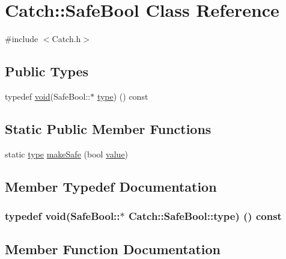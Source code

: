 \hypertarget{class_catch_1_1_safe_bool}{}\section{Catch\+:\+:Safe\+Bool Class Reference}
\label{class_catch_1_1_safe_bool}


{\ttfamily \#include $<$Catch.\+h$>$}

\subsection*{Public Types}
\begin{DoxyCompactItemize}
\item 
typedef \hyperlink{_s_d_l__opengles2__gl2ext_8h_ae5d8fa23ad07c48bb609509eae494c95}{void}(Safe\+Bool\+::$\ast$ \hyperlink{class_catch_1_1_safe_bool_a852cdacb020a98edeee0f4da4cf790d5}{type}) () const 
\end{DoxyCompactItemize}
\subsection*{Static Public Member Functions}
\begin{DoxyCompactItemize}
\item 
static \hyperlink{_s_d_l__opengl_8h_ad5ddf6fca7b585646515660e810e0188}{type} \hyperlink{class_catch_1_1_safe_bool_af0ea63d9820f8bf7a8b76377913c4e77}{make\+Safe} (bool \hyperlink{_s_d_l__opengl__glext_8h_a8ad81492d410ff2ac11f754f4042150f}{value})
\end{DoxyCompactItemize}


\subsection{Member Typedef Documentation}
\subsubsection[{\texorpdfstring{type}{type}}]{\setlength{\rightskip}{0pt plus 5cm}typedef {\bf void}(Safe\+Bool\+::$\ast$ Catch\+::\+Safe\+Bool\+::type) () const }\hypertarget{class_catch_1_1_safe_bool_a852cdacb020a98edeee0f4da4cf790d5}{}\label{class_catch_1_1_safe_bool_a852cdacb020a98edeee0f4da4cf790d5}


\subsection{Member Function Documentation}
